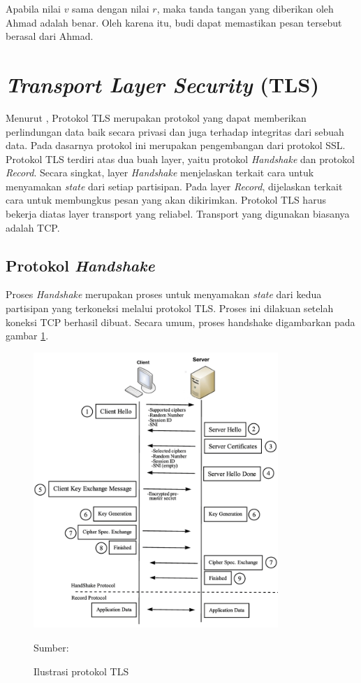Apabila nilai $v$ sama dengan nilai $r$, maka tanda tangan yang diberikan oleh Ahmad adalah benar. Oleh karena itu, budi dapat memastikan pesan tersebut berasal dari Ahmad.

\section{\emph{Transport Layer Security} (TLS)}
Menurut \textcite{rfc5246}, Protokol TLS merupakan protokol yang dapat memberikan perlindungan data baik secara privasi dan juga terhadap integritas dari sebuah data. Pada dasarnya protokol ini merupakan pengembangan dari protokol SSL. Protokol TLS terdiri atas dua buah layer, yaitu protokol \emph{Handshake} dan protokol \emph{Record}. Secara singkat, layer \emph{Handshake} menjelaskan terkait cara untuk menyamakan \emph{state} dari setiap partisipan. Pada layer \emph{Record}, dijelaskan terkait cara untuk membungkus pesan yang akan dikirimkan. Protokol TLS harus bekerja diatas layer transport yang reliabel. Transport yang digunakan biasanya adalah TCP.

\subsection{Protokol \emph{Handshake}}
Proses \emph{Handshake} merupakan proses untuk menyamakan \emph{state} dari kedua partisipan yang terkoneksi melalui protokol TLS. Proses ini dilakuan setelah koneksi TCP berhasil dibuat. Secara umum, proses handshake
digambarkan pada gambar \ref{fig:tls.handshake}.

\begin{figure}[!h]
  \centering
  \includegraphics[width=350px]{chapters/res/chapter-2/img/tls.protocol.png}
  \caption{Ilustrasi protokol TLS} \label{fig:tls.handshake}
  Sumber: \textcite{shbair2016}
\end{figure}

